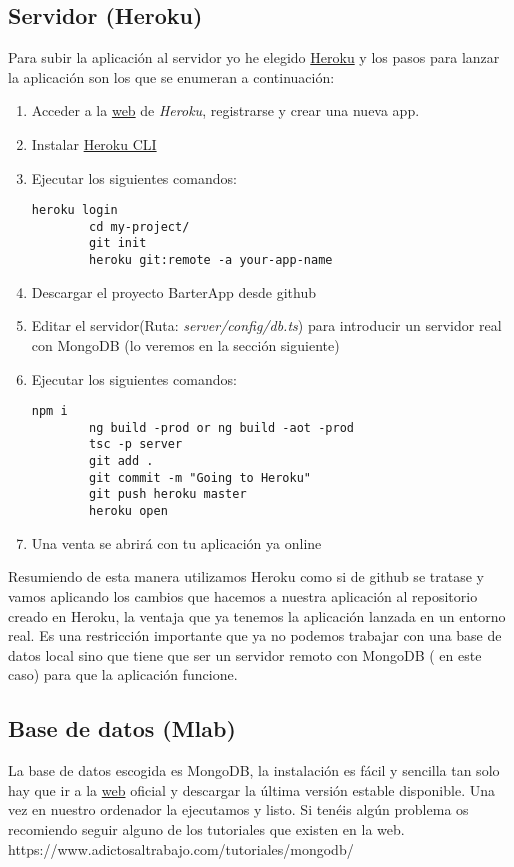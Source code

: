 \subsection{Servidor (Heroku)}
Para subir la aplicación al servidor yo he elegido \hyperlink{https://www.heroku.com/}{Heroku} y los pasos para lanzar la aplicación son los que se enumeran a continuación:

\begin{enumerate}
	\item Acceder a la \hyperlink{https://www.heroku.com/}{web} de \emph{Heroku}, registrarse y crear una nueva app.
	\item Instalar \hyperlink{https://devcenter.heroku.com/articles/heroku-cli}{Heroku CLI}
	\item Ejecutar los siguientes comandos:
		\lstset{language=C, breaklines=true, basicstyle=\footnotesize}
		\begin{lstlisting}[frame=single]
		heroku login
		cd my-project/
		git init
		heroku git:remote -a your-app-name
    	\end{lstlisting}
	\item Descargar el proyecto BarterApp desde github 
	\item Editar el servidor(Ruta: \emph{server/config/db.ts}) para introducir un servidor real con MongoDB (lo veremos en la sección siguiente)
	\item Ejecutar los siguientes comandos:
		\lstset{language=C, breaklines=true, basicstyle=\footnotesize}
		\begin{lstlisting}[frame=single]
		npm i
		ng build -prod or ng build -aot -prod
		tsc -p server
		git add .
		git commit -m "Going to Heroku"
		git push heroku master
		heroku open
    	\end{lstlisting}
	\item Una venta se abrirá con tu aplicación ya online
\end{enumerate}

Resumiendo de esta manera utilizamos Heroku como si de github se tratase y vamos aplicando los cambios que hacemos a nuestra aplicación al repositorio creado en Heroku, la ventaja que ya tenemos la aplicación lanzada en un entorno real. Es una restricción importante que ya no podemos trabajar con una base de datos local sino que tiene que ser un servidor remoto con MongoDB ( en este caso) para que la aplicación funcione.
	

\subsection{Base de datos (Mlab)}
La base de datos escogida es MongoDB, la instalación es fácil y sencilla tan solo hay que ir a la \hyperlink{http://www.mongodb.org/downloads}{web} oficial y descargar la última versión estable disponible. Una vez en nuestro ordenador la ejecutamos y listo.  Si tenéis algún problema os recomiendo seguir alguno de los tutoriales que existen en la web. https://www.adictosaltrabajo.com/tutoriales/mongodb/

